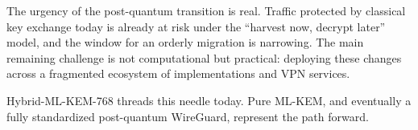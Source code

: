 The urgency of the post-quantum transition is real. Traffic protected by classical key exchange today is already at risk under the ``harvest now, decrypt later'' model, and the window for an orderly migration is narrowing. The main remaining challenge is not computational but practical: deploying these changes across a fragmented ecosystem of implementations and VPN services.
 
Hybrid-ML-KEM-768 threads this needle today. Pure ML-KEM, and eventually a fully standardized post-quantum WireGuard, represent the path forward.